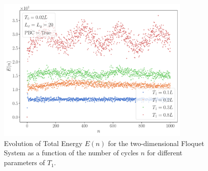 \documentclass[11pt, a4paper]{article}
\theoremstyle{definition} %
\begin{document}
\begin{figure}[h]
\centering
\includegraphics[width = 0.85\textwidth]{TotalEnergyNonHeating2d_Multiple}
\caption{Evolution of Total Energy $E(n)$ for the two-dimensional Floquet System as a function of the number of cycles $n$ for different parameters of $T_1$.}
\end{figure}
\end{document}
